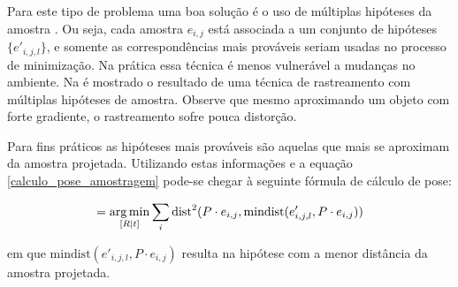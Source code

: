 Para este tipo de problema uma boa solução é o uso de múltiplas hipóteses da amostra \cite{multiplas_hipoteses}. Ou seja, cada amostra $e_{i,j}$ está associada a um conjunto de hipóteses $\{e'_{i,j,l}\}$, e somente as correspondências mais prováveis seriam usadas no processo de minimização. Na prática essa técnica é menos vulnerável a mudanças no ambiente. Na  é mostrado o resultado de uma técnica de rastreamento com múltiplas hipóteses de amostra. Observe que mesmo aproximando um objeto com forte gradiente, o rastreamento sofre pouca distorção.

Para fins práticos as hipóteses mais prováveis são aquelas que mais se aproximam da amostra projetada. Utilizando estas informações e a equação \eqref{calculo_pose_amostragem} pode-se chegar à seguinte fórmula de cálculo de pose:

\begin{equation}
[R | t] = \argmin_{[R | t]} \sum_i \text{dist}^2(P \cdot e_{i,j}, \text{mindist}(e'_{i,j,l}, P \cdot e_{i,j}))
\end{equation}

\noindent
em que $\text{mindist}(e'_{i,j,l}, P \cdot e_{i,j})$ resulta na hipótese com a menor distância da amostra projetada.

